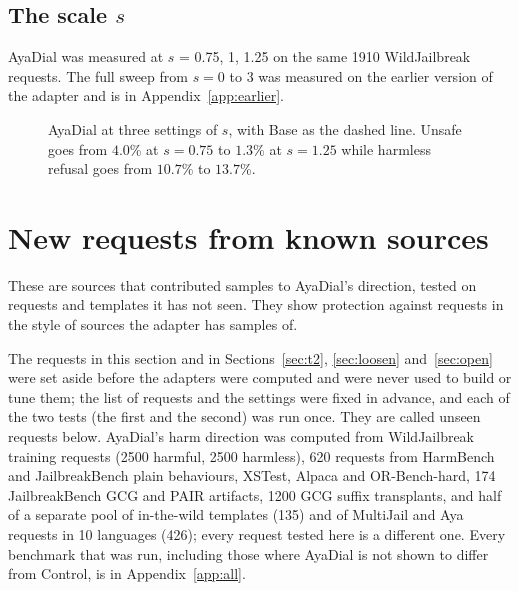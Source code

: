 \documentclass[10pt,a4paper]{article}
\begin{document}
\subsection{The scale $s$}
AyaDial was measured at $s$ = 0.75, 1, 1.25 on the same 1910 WildJailbreak requests. The full sweep from $s = 0$ to 3 was measured on the earlier version of the adapter and is in Appendix~\ref{app:earlier}.
\begin{figure}[H]\centering
{}
\caption{AyaDial at three settings of $s$, with Base as the dashed line. Unsafe goes from $4.0$\% at $s = 0.75$ to $1.3$\% at $s = 1.25$ while harmless refusal goes from $10.7$\% to $13.7$\%.}\label{fig:dial}
\end{figure}
\section{New requests from known sources}\label{sec:t1}
These are sources that contributed samples to AyaDial's direction, tested on requests and templates it has not seen. They show protection against requests in the style of sources the adapter has samples of.

The requests in this section and in Sections~\ref{sec:t2}, \ref{sec:loosen} and~\ref{sec:open} were set aside before the adapters were computed and were never used to build or tune them; the list of requests and the settings were fixed in advance, and each of the two tests (the first and the second) was run once. They are called unseen requests below. AyaDial's harm direction was computed from WildJailbreak training requests (2500 harmful, 2500 harmless), 620 requests from HarmBench and JailbreakBench plain behaviours, XSTest, Alpaca and OR-Bench-hard, 174 JailbreakBench GCG and PAIR artifacts, 1200 GCG suffix transplants, and half of a separate pool of in-the-wild templates (135) and of MultiJail and Aya requests in 10 languages (426); every request tested here is a different one. Every benchmark that was run, including those where AyaDial is not shown to differ from Control, is in Appendix~\ref{app:all}.
\end{document}
